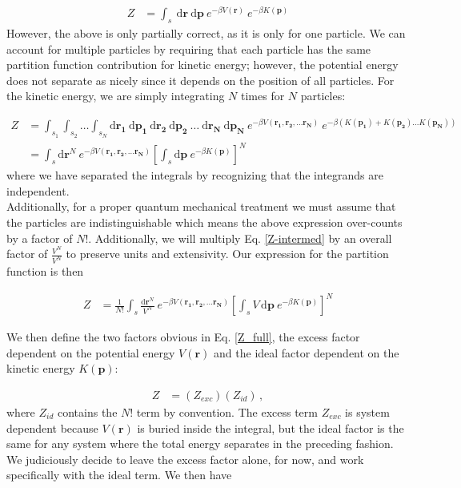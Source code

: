 \documentclass[12pt]{article}
\newcommand*{\diff}{\mathrm{d}}
\begin{document}
\begin{align}
    Z &= \int_s~ \diff\mathbf{r}~ \diff\mathbf{p} ~e^{-\beta V(\mathbf{r})}~e^{-\beta K(\mathbf{p})}
\end{align} 
However, the above is only partially correct, as it is only for one particle. We can account for multiple particles by requiring that each particle has the same partition function contribution for kinetic energy; however, the potential energy does not separate as nicely since it depends on the position of all particles. For the kinetic energy, we are simply integrating $N$ times for $N$ particles:

\begin{align}
    Z &= \int_{s_1} \int_{s_2} \dots \int_{s_N} \diff\mathbf{r_1}~ \diff\mathbf{p_1} ~\diff\mathbf{r_2} ~\diff\mathbf{p_2} ~\dots ~\diff\mathbf{r_N}~ \diff\mathbf{p_N} ~e^{-\beta V(\mathbf{r_1}, \mathbf{r_2}, \dots \mathbf{r_N})}~e^{-\beta(K(\mathbf{p_1}) + K(\mathbf{p_2}) ... K(\mathbf{p_N}))}\\
    &= \int_s \diff\mathbf{r}^N ~e^{-\beta V(\mathbf{r_1}, \mathbf{r_2}, \dots \mathbf{r_N})} \left[\int_s \diff\mathbf{p}~e^{-\beta K(\mathbf{p})}\right]^{N}
    \label{Z-intermed}
\end{align}
where we have separated the integrals by recognizing that the integrands are independent.\\
Additionally, for a proper quantum mechanical treatment we must assume that the particles are indistinguishable which means the above expression over-counts by a factor of $N!$. Additionally, we will multiply Eq. \ref{Z-intermed} by an overall factor of $\frac{V^N}{V^N}$ to preserve units and extensivity. Our expression for the partition function is then 

\begin{align}
    Z &= \frac{1}{ N!}\int_s \frac{\diff\mathbf{r}^N}{V^N} ~e^{-\beta V(\mathbf{r_1}, \mathbf{r_2}, \dots \mathbf{r_N})} \left[\int_s V\,\diff\mathbf{p}~e^{-\beta K(\mathbf{p})}\right]^{N}
    \label{Z_full}
\end{align}

We then define the two factors obvious in Eq. \ref{Z_full}, the excess factor dependent on the potential energy $V(\mathbf{r})$ and the ideal factor dependent on the kinetic energy $K(\mathbf{p})$: 

\begin{align}
    Z &= (Z_{exc})(Z_{id}) \,,
\end{align}
where $Z_{id}$ contains the $N!$ term by convention. The excess term $Z_{exc}$ is system dependent because $V(\mathbf{r})$ is buried inside the integral, but the ideal factor is the same for any system where the total energy separates in the preceding fashion. We judiciously decide to leave the excess factor alone, for now, and work specifically with the ideal term. We then have
\end{document}
